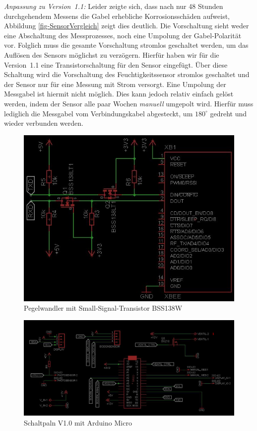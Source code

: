 \emph{Anpassung zu Version~1.1:}
Leider zeigte sich, dass nach nur 48 Stunden durchgehendem Messens die Gabel erhebliche Korrosionsschäden aufweist, Abbildung \ref{fig-SensorVergleich} zeigt dies deutlich.
Die Vorschaltung sieht weder eine Abschaltung des Messprozesses, noch eine Umpolung der Gabel-Polarität vor. 
Folglich muss die gesamte Vorschaltung stromlos geschaltet werden, um das Auflösen des Sensors möglichst zu verzögern. 
Hierfür haben wir für die Version~1.1 eine Transistorschaltung für den Sensor eingefügt. 
Über diese Schaltung wird die Vorschaltung des Feuchtigkeitssensor stromlos geschaltet und der Sensor nur für eine Messung mit Strom versorgt. 
Eine Umpolung der Messgabel ist hiermit nicht möglich. Dies kann jedoch relativ einfach gelöst werden, indem der Sensor alle paar Wochen \emph{manuell} umgepolt wird. 
Hierfür muss lediglich die Messgabel vom Verbindungskabel abgesteckt, um \begin{math}180^{\circ}\end{math} gedreht und wieder verbunden werden.



\begin{figure}[h]
	\centering
	\includegraphics[width=0.9\linewidth]{bilder/v1SchaltplanXbee.jpg}
	\caption{Pegelwandler mit Small-Signal-Transistor BSS138W }
	\label{fig-Pegel}
\end{figure}

\begin{figure}[th]
	\centering
	\includegraphics[width=0.85\linewidth]{bilder/v1SchaltplanMicro0.JPG}
	\caption{Schaltpaln V1.0 mit Arduino Micro}
	\label{fig-Schaltplanv1.0}
\end{figure}

